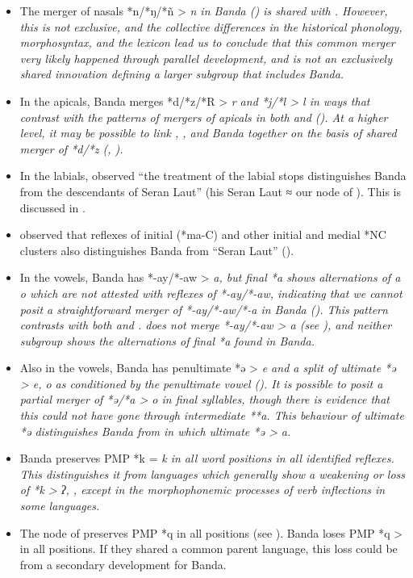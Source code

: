 \begin{itemize}
		\item	The merger of nasals *n/*ŋ/*ñ > \it{n} in Banda ()
					is shared with .
					However, this is not exclusive,
					and the collective differences in the historical phonology,
					morphosyntax, and the lexicon lead us to conclude that this
					common merger very likely happened through parallel development,
					and is not an exclusively shared innovation defining a larger
					subgroup that includes Banda.
		\item	In the apicals,
					Banda merges *d/*z/*R > \it{r}
					and *j/*l > \it{l} in ways that contrast with the patterns of
					mergers of apicals in both  and  ().
					At a higher level,
					it may be possible to link ,
					, and Banda together on the basis
					of shared merger of *d/*z (, ).
		\item	In the labials,
					\citet[133]{Collins1986} observed “the treatment of the labial
					stops distinguishes Banda from the descendants of Seran Laut”
					(his Seran Laut ≈ our  node of ).
					This is discussed in .
		\item	\citet[133f]{Collins1986} observed that reflexes of initial
					(*ma-C) and other initial and medial *NC clusters also distinguishes
					Banda from “Seran Laut” ().
		\item	In the vowels,
					Banda has *-ay/*-aw > \it{a},
					but final *a shows alternations of \it{a {\tl} o} which are not
					attested with reflexes of *-ay/*-aw,
					indicating that we cannot posit a straightforward merger of *-ay/*-aw/*-a in Banda ().
					This pattern contrasts with both  and .
					 does not merge *-ay/*-aw > \it{a} (see ),
					and neither subgroup shows the alternations of final *a found in Banda.
		\item	Also in the vowels,
					Banda has penultimate *ə > \it{e}
					and a split of ultimate *ə > \it{e,
					o} as conditioned by the penultimate vowel ().
					It is possible to posit a partial merger of *ə/*a > \it{o} in
					final syllables, though there is evidence that this could not have gone through intermediate **a.
					This behaviour of ultimate *ə distinguishes Banda from 
					in which ultimate *ə > \it{a}.
		\item	Banda preserves PMP *k = \it{k} in all word positions in all identified reflexes.
					This distinguishes it from  languages which
					generally show a weakening or loss of *k > \it{ʔ},
					{\0}, except in the morphophonemic processes of verb inflections in some languages.
		\item	The  node of 
					preserves PMP *q in all positions (see ).
					Banda loses PMP *q > {\0} in all positions.
					If they shared a common parent language,
					this loss could be from a secondary development for Banda.
\end{itemize}

